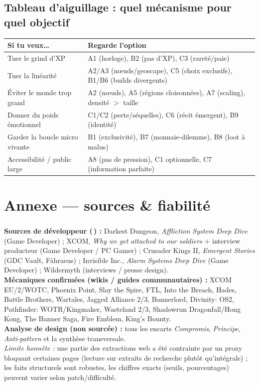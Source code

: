 \documentclass[11pt,a4paper]{article}
\newcommand{\dv}{\,\textsuperscript{\textcolor{accent2}{\textdagger}}}
\begin{document}
\subsection*{Tableau d'aiguillage : quel mécanisme pour quel objectif}
\begin{center}\small
\begin{tabular}{p{5.3cm}p{9.2cm}}
\hline
\textbf{Si tu veux\dots} & \textbf{Regarde l'option} \\
\hline
Tuer le grind d'XP & A1 (horloge), B2 (pas d'XP), C3 (rareté/paie) \\
Tuer la linéarité & A2/A3 (nœuds/geoscape), C5 (choix exclusifs), B1/B6 (builds divergents) \\
Éviter le monde trop grand & A2 (nœuds), A5 (régions cloisonnées), A7 (scaling), densité $>$ taille \\
Donner du poids émotionnel & C1/C2 (perte/séquelles), C6 (récit émergent), B9 (identité) \\
Garder la boucle micro vivante & B1 (exclusivité), B7 (monnaie-dilemme), B8 (loot à malus) \\
Accessibilité / public large & A8 (pas de pression), C1 optionnelle, C7 (information parfaite) \\
\hline
\end{tabular}
\end{center}

\section*{Annexe --- sources \& fiabilité}
\small
\textbf{Sources de développeur (\dv) :} Darkest Dungeon, \emph{Affliction System Deep Dive} (Game Developer) ; XCOM, \emph{Why we get attached to our soldiers} + interview producteur (Game Developer / PC Gamer) ; Crusader Kings II, \emph{Emergent Stories} (GDC Vault, Fåhraeus) ; Invisible Inc., \emph{Alarm Systems Deep Dive} (Game Developer) ; Wildermyth (interviews / presse design). \\[3pt]
\textbf{Mécaniques confirmées (wikis / guides communautaires) :} XCOM EU/2/WOTC, Phoenix Point, Slay the Spire, FTL, Into the Breach, Hades, Battle Brothers, Wartales, Jagged Alliance 2/3, Bannerlord, Divinity: OS2, Pathfinder: WOTR/Kingmaker, Wasteland 2/3, Shadowrun Dragonfall/Hong Kong, The Banner Saga, Fire Emblem, King's Bounty. \\[3pt]
\textbf{Analyse de design (non sourcée) :} tous les encarts \emph{Compromis}, \emph{Principe}, \emph{Anti-pattern} et la synthèse transversale. \\[3pt]
\textit{Limite honnête :} une partie des extractions web a été contrainte par un proxy bloquant certaines pages (lecture sur extraits de recherche plutôt qu'intégrale) ; les faits structurels sont robustes, les chiffres exacts (seuils, pourcentages) peuvent varier selon patch/difficulté.
\end{document}
